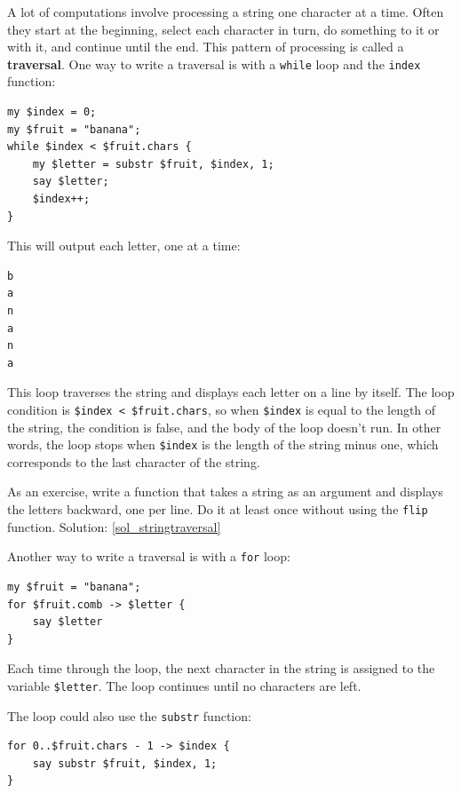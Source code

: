 A lot of computations involve processing a string one 
character at a time.  Often they start at the beginning, 
select each character in turn, do something to it or with 
it, and continue until the end.  This pattern of
processing is called a {\bf traversal}.  One way to write
a traversal is with a {\tt while} loop and the 
{\tt index} function:

\begin{verbatim}
my $index = 0;
my $fruit = "banana";
while $index < $fruit.chars { 
    my $letter = substr $fruit, $index, 1; 
    say $letter; 
    $index++;
}
\end{verbatim}
%

This will output each letter, one at a time:
\begin{verbatim}
b
a
n
a
n
a
\end{verbatim}
%
This loop traverses the string and displays each letter on 
a line by itself.  The loop condition is 
{\tt \$index < \$fruit.chars}, so when {\tt \$index} is equal 
to the length of the string, the condition is false, and 
the body of the loop doesn't run. In other words, the loop 
stops when {\tt \$index} is the length of the string minus 
one, which corresponds to the last character of the string.

As an exercise, write a function that takes a string as 
an argument and displays the letters backward, one 
per line. Do it at least once without using the 
{\tt flip} function. Solution: \ref{sol_stringtraversal}

Another way to write a traversal is with a {\tt for} loop:

\begin{verbatim}
my $fruit = "banana";
for $fruit.comb -> $letter {
    say $letter
}
\end{verbatim}
%

Each time through the loop, the next character in the string 
is assigned to the variable {\tt \$letter}.  The loop 
continues until no characters are left.

The loop could also use the {\tt substr} function:

\begin{verbatim}
for 0..$fruit.chars - 1 -> $index {
    say substr $fruit, $index, 1;
}
\end{verbatim}
%


